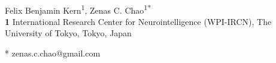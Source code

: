\documentclass[10pt,letterpaper]{article}
\begin{document}
\vspace*{0.2in}

\begin{flushleft}
{\Large
\textbf{} %
}
\newline
\\
Felix Benjamin Kern\textsuperscript{1},
Zenas C. Chao\textsuperscript{1*}
\\
\bigskip
\textbf{1} International Research Center for Neurointelligence (WPI-IRCN), The University of Tokyo, Tokyo, Japan
\\
\bigskip

% 
%





* zenas.c.chao@gmail.com

\end{flushleft}
\end{document}
